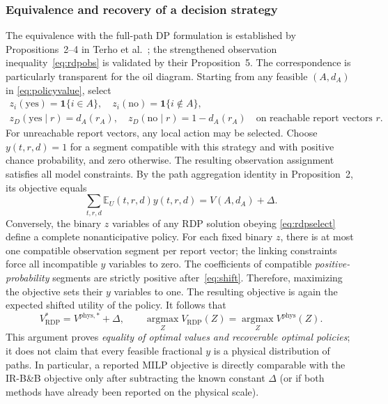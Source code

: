 \documentclass[11pt,a4paper]{article}
\newcommand{\one}{\mathbf{1}}
\begin{document}
\subsubsection{Equivalence and recovery of a decision strategy}
The equivalence with the full-path DP formulation is established by
Propositions~2--4 in Terho et al.~\cite{Terho2026}; the strengthened
observation inequality~\eqref{eq:rdpobs} is validated by their
Proposition~5.  The correspondence is particularly transparent for
the oil diagram.  Starting from any feasible $(A,d_A)$ in
\eqref{eq:policyvalue}, select
\begin{equation}\label{eq:recoverz}
 \begin{gathered}
 z_i(\mathrm{yes})=\one\{i\in A\},\quad
 z_i(\mathrm{no})=\one\{i\notin A\},\\
 z_D(\mathrm{yes}\mid r)=d_A(r_A),\quad
 z_D(\mathrm{no}\mid r)=1-d_A(r_A)
 \quad\text{on reachable report vectors }r.
 \end{gathered}
\end{equation}
For unreachable report vectors, any local action may be selected.
Choose $y(t,r,d)=1$ for a segment compatible with this strategy
and with positive chance probability, and zero otherwise.  The
resulting observation assignment satisfies all model constraints.
By the path aggregation identity in Proposition~2, its objective equals
\begin{equation}\label{eq:shiftedvalue}
 \sum_{t,r,d}\mathbb E_U(t,r,d)y(t,r,d)
   =V(A,d_A)+\Delta.
\end{equation}
Conversely, the binary $z$ variables of any RDP solution obeying
\eqref{eq:rdpselect} define a complete nonanticipative policy.
For each fixed binary $z$, there is at most one compatible
observation segment per report vector; the linking constraints
force all incompatible $y$ variables to zero.  The coefficients of
compatible \emph{positive-probability} segments are strictly positive
after~\eqref{eq:shift}. Therefore, maximizing the objective sets
their $y$ variables to one. The resulting objective is again the
expected shifted utility of the policy. It follows that
\begin{equation}\label{eq:rdprelation}
 V_{\mathrm{RDP}}^*=V^{\mathrm{phys},*}+\Delta,
 \qquad
 \operatorname*{argmax}_{Z}V_{\mathrm{RDP}}(Z)
 =\operatorname*{argmax}_{Z}V^{\mathrm{phys}}(Z).
\end{equation}
This argument proves \emph{equality of optimal values and recoverable
optimal policies}; it does not claim that every feasible fractional
$y$ is a physical distribution of paths.  In particular, a reported
MILP objective is directly comparable with the IR-B\&B objective
only after subtracting the known constant $\Delta$ (or if both
methods have already been reported on the physical scale).
\end{document}
